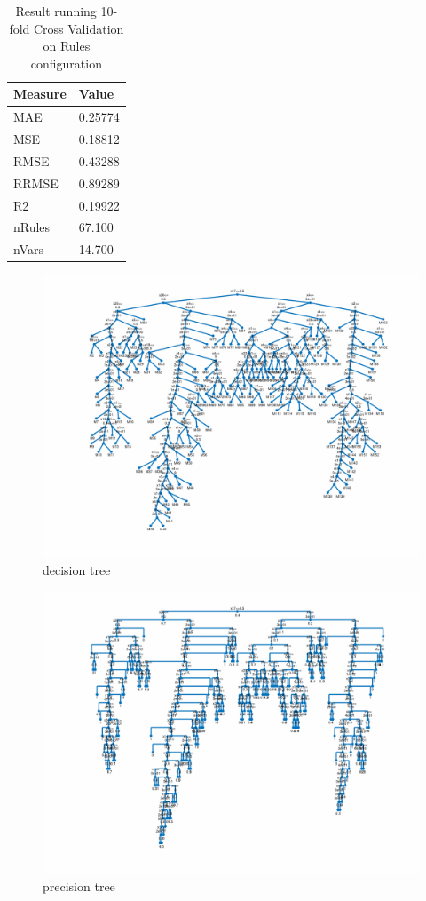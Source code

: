 \documentclass{article}
\begin{document}
\begin{table}[H]
	\centering
	\caption{Result running 10-fold Cross Validation on Rules configuration}
	\label{tab:Key-Indicator-RC}
	\begin{tabular}{|l|l|}
		\hline
		\textbf{Measure} 	& \textbf{Value} \\ \hline
		MAE       			& 0.25774 		 \\ \hline
		MSE       			& 0.18812 		 \\ \hline
		RMSE       			& 0.43288		 \\ \hline
		RRMSE       		& 0.89289 	  	 \\ \hline
		R2       			& 0.19922  	 	 \\ \hline
		nRules       		& 67.100   		 \\ \hline
		nVars       		& 14.700   		 \\ \hline
	\end{tabular}
\end{table}
\newpage
\vfill
\begin{figure}
	\includegraphics[width=\textwidth,height=\textheight,keepaspectratio]{decision_tree.png}
	\caption{decision tree}
\end{figure}	
\begin{figure}
	\centering
	\includegraphics[width=\textwidth,height=\textheight,keepaspectratio]{precision_tree.png}
	\caption{precision tree}
\end{figure}
\end{document}
